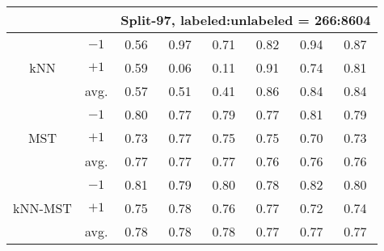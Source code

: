 \begin{table}[t!]
{\begin{tabular}{ c|c|ccc|ccc }
			\multicolumn{2}{c}{} & \multicolumn{6}{c}{Split-97, labeled:unlabeled = 266:8604}\\
			
			\hline
			\multirow{3}{*}{kNN} 
			& $-1$ & 0.56 & 0.97 & 0.71 & 0.82 & 0.94 & 0.87 \\
			& $+1$ & 0.59 & 0.06 & 0.11 & 0.91 & 0.74 & 0.81 \\
			\cline{2-8}
			& avg. & 0.57 & 0.51 & 0.41 & 0.86 & 0.84 & 0.84 \\
			\hline
			\multirow{3}{*}{MST} 
			& $-1$ & 0.80 & 0.77 & 0.79 & 0.77 & 0.81 & 0.79 \\
			& $+1$ & 0.73 & 0.77 & 0.75 & 0.75 & 0.70 & 0.73 \\
			\cline{2-8}
			& avg. & 0.77 & 0.77 & 0.77 & 0.76 & 0.76 & 0.76 \\
			\hline
			\multirow{3}{*}{kNN-MST} 
			& $-1$ & 0.81 & 0.79 & 0.80 & 0.78 & 0.82 & 0.80 \\
			& $+1$ & 0.75 & 0.78 & 0.76 & 0.77 & 0.72 & 0.74 \\
			\cline{2-8}
			& avg. & 0.78 & 0.78 & 0.78 & 0.77 & 0.77 & 0.77 \\
			\hline
			
	\end{tabular}}
\end{table}